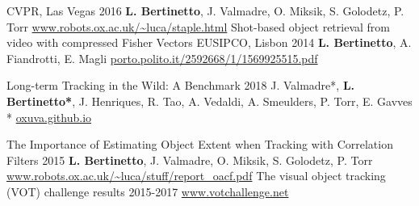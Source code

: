 \begin{cvpapers}
    {CVPR, Las Vegas} %
    {2016} %
  \cvpaperauthors
    {\textbf{L. Bertinetto}, J. Valmadre, O. Miksik, S. Golodetz, P. Torr}
    {} %
    {} %
  \cvpaperurl
    {\href{http://www.robots.ox.ac.uk/~luca/staple.html}{www.robots.ox.ac.uk/\textasciitilde luca/staple.html}}
    {} %
    {} %
  \cvpapertitle
    {Shot-based object retrieval from video with compressed Fisher Vectors} %
    {EUSIPCO, Lisbon} %
    {2014} %
  \cvpaperauthors
    {\textbf{L. Bertinetto}, A. Fiandrotti, E. Magli}
    {} %
    {} %
  \cvpaperurl
    {\href{http://porto.polito.it/2592668/1/1569925515.pdf}{porto.polito.it/2592668/1/1569925515.pdf}}
    {} %
    {} %

\end{cvpapers}

\newpage


\begin{cvpapers}
\cvpapertitle
    {Long-term Tracking in the Wild: A Benchmark}
    {} %
    {2018} %
  \cvpaperauthors
    {J. Valmadre*, \textbf{L. Bertinetto*}, J. Henriques, R. Tao, A. Vedaldi, A. Smeulders, P. Torr, E. Gavves *}
    {} %
    {} %
  \cvpaperurl
    {\href{https://oxuva.github.io/long-term-tracking-benchmark}{oxuva.github.io}}
    {} %
    {} %

  \cvpapertitle
    {The Importance of Estimating Object Extent when Tracking with Correlation Filters} %
    {} %
    {2015} %
  \cvpaperauthors
    {\textbf{L. Bertinetto}, J. Valmadre,  O. Miksik, S. Golodetz, P. Torr}
    {} %
    {} %
  \cvpaperurl
    {\href{http://www.robots.ox.ac.uk/~luca/stuff/report_oacf.pdf}{www.robots.ox.ac.uk/\textasciitilde luca/stuff/report\_oacf.pdf}}
    {} %
    {} %
  \cvpapertitle
    {The visual object tracking (VOT) challenge results} %
    {} %
    {2015-2017} %
  \cvpaperurl
    {\href{http://www.votchallenge.net}{www.votchallenge.net}}
    {} %
    {} %

\end{cvpapers}
